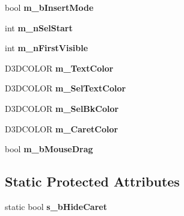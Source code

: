 \begin{DoxyCompactItemize}
\item 
\hypertarget{class_c_d_x_u_t_edit_box_adb1eaad549f7da1b5eca182d45454fc3}{bool {\bfseries m\+\_\+b\+Insert\+Mode}}\label{class_c_d_x_u_t_edit_box_adb1eaad549f7da1b5eca182d45454fc3}

\item 
\hypertarget{class_c_d_x_u_t_edit_box_abe8996fe747a8a8244ded9f65b192e21}{int {\bfseries m\+\_\+n\+Sel\+Start}}\label{class_c_d_x_u_t_edit_box_abe8996fe747a8a8244ded9f65b192e21}

\item 
\hypertarget{class_c_d_x_u_t_edit_box_a4f20f987232887403d1234cd275a5e30}{int {\bfseries m\+\_\+n\+First\+Visible}}\label{class_c_d_x_u_t_edit_box_a4f20f987232887403d1234cd275a5e30}

\item 
\hypertarget{class_c_d_x_u_t_edit_box_a4007e072bfbf278bc3cadca555e48ced}{D3\+D\+C\+O\+L\+O\+R {\bfseries m\+\_\+\+Text\+Color}}\label{class_c_d_x_u_t_edit_box_a4007e072bfbf278bc3cadca555e48ced}

\item 
\hypertarget{class_c_d_x_u_t_edit_box_af7ad30e9b036e11cc008d6061e50fb5c}{D3\+D\+C\+O\+L\+O\+R {\bfseries m\+\_\+\+Sel\+Text\+Color}}\label{class_c_d_x_u_t_edit_box_af7ad30e9b036e11cc008d6061e50fb5c}

\item 
\hypertarget{class_c_d_x_u_t_edit_box_a823226b75c0622be3af28a45fedfaeb8}{D3\+D\+C\+O\+L\+O\+R {\bfseries m\+\_\+\+Sel\+Bk\+Color}}\label{class_c_d_x_u_t_edit_box_a823226b75c0622be3af28a45fedfaeb8}

\item 
\hypertarget{class_c_d_x_u_t_edit_box_a9b0c3fb3ddfebd5780f1656048a83c1c}{D3\+D\+C\+O\+L\+O\+R {\bfseries m\+\_\+\+Caret\+Color}}\label{class_c_d_x_u_t_edit_box_a9b0c3fb3ddfebd5780f1656048a83c1c}

\item 
\hypertarget{class_c_d_x_u_t_edit_box_a09b9f704dcf36c70e025c30d32d5d218}{bool {\bfseries m\+\_\+b\+Mouse\+Drag}}\label{class_c_d_x_u_t_edit_box_a09b9f704dcf36c70e025c30d32d5d218}

\end{DoxyCompactItemize}
\subsection*{Static Protected Attributes}
\begin{DoxyCompactItemize}
\item 
\hypertarget{class_c_d_x_u_t_edit_box_af6ee4773c910f27f0b0a4b1d8d47e148}{static bool {\bfseries s\+\_\+b\+Hide\+Caret}}\label{class_c_d_x_u_t_edit_box_af6ee4773c910f27f0b0a4b1d8d47e148}

\end{DoxyCompactItemize}
